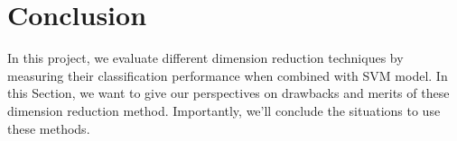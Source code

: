 \documentclass{article}
\begin{document}
\section{Conclusion}
In this project, we evaluate different dimension reduction techniques by measuring their classification performance when combined with SVM model. In this Section, we want to give our perspectives on drawbacks and merits of these dimension reduction method. Importantly, we'll conclude the situations to use these methods.


\end{document}
